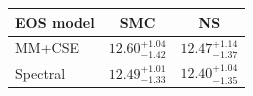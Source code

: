 \renewcommand{\arraystretch}{1.4}
\begin{tabular}{lcc}
    \hline
    EOS model & SMC & NS \\
    \hline
    MM+CSE & $12.60^{+1.04}_{-1.42}$ & $12.47^{+1.14}_{-1.37}$ \\
    Spectral & $12.49^{+1.01}_{-1.33}$ & $12.40^{+1.04}_{-1.35}$ \\
    \hline
\end{tabular}
